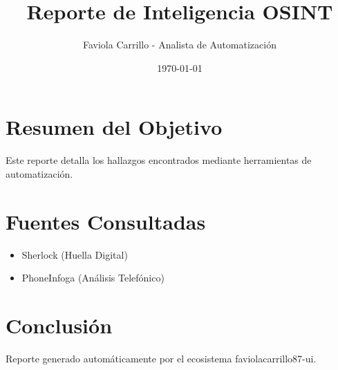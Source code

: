 \documentclass{article}
\title{Reporte de Inteligencia OSINT}
\author{Faviola Carrillo - Analista de Automatización}
\date{\today}
\begin{document}
\maketitle
\section{Resumen del Objetivo}
Este reporte detalla los hallazgos encontrados mediante herramientas de automatización.

\section{Fuentes Consultadas}
\begin{itemize}
    \item Sherlock (Huella Digital)
    \item PhoneInfoga (Análisis Telefónico)
\end{itemize}

\section{Conclusión}
Reporte generado automáticamente por el ecosistema faviolacarrillo87-ui.
\end{document}
